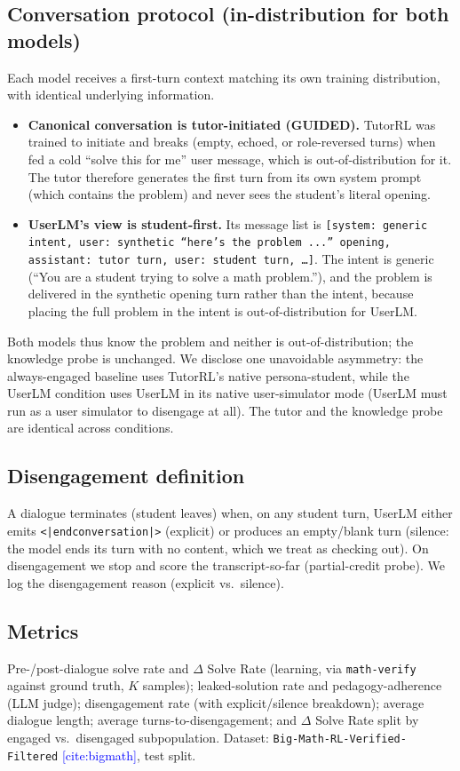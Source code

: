\documentclass[11pt]{article}
\newcommand{\cit}[1]{\textcolor{blue}{[\textsf{cite:#1}]}}
\begin{document}
\subsection{Conversation protocol (in-distribution for both models)}
Each model receives a first-turn context matching its own training distribution,
with identical underlying information.
\begin{itemize}
  \item \textbf{Canonical conversation is tutor-initiated (GUIDED).} TutorRL was
    trained to initiate and breaks (empty, echoed, or role-reversed turns) when
    fed a cold ``solve this for me'' user message, which is out-of-distribution
    for it. The tutor therefore generates the first turn from its own system
    prompt (which contains the problem) and never sees the student's literal
    opening.
  \item \textbf{UserLM's view is student-first.} Its message list is
    \texttt{[system: generic intent, user: synthetic ``here's the problem ...''
    opening, assistant: tutor turn, user: student turn, \ldots]}. The intent is
    generic (``You are a student trying to solve a math problem.''), and the
    problem is delivered in the synthetic opening turn rather than the intent,
    because placing the full problem in the intent is out-of-distribution for
    UserLM.
\end{itemize}
Both models thus know the problem and neither is out-of-distribution; the
knowledge probe is unchanged. We disclose one unavoidable asymmetry: the
always-engaged baseline uses TutorRL's native persona-student, while the UserLM
condition uses UserLM in its native user-simulator mode (UserLM must run as a
user simulator to disengage at all). The tutor and the knowledge probe are
identical across conditions.

\subsection{Disengagement definition}
A dialogue terminates (student leaves) when, on any student turn, UserLM either
emits \texttt{<|endconversation|>} (explicit) or produces an empty/blank turn
(silence: the model ends its turn with no content, which we treat as
checking out). On disengagement we stop and score the transcript-so-far
(partial-credit probe). We log the disengagement reason (explicit vs.\ silence).

\subsection{Metrics}
Pre-/post-dialogue solve rate and $\Delta$ Solve Rate (learning, via
\texttt{math-verify} against ground truth, $K$ samples); leaked-solution rate and
pedagogy-adherence (LLM judge); disengagement rate (with explicit/silence
breakdown); average dialogue length; average turns-to-disengagement; and $\Delta$
Solve Rate split by engaged vs.\ disengaged subpopulation. Dataset:
\texttt{Big-Math-RL-Verified-Filtered} \cit{bigmath}, test split.
\end{document}
